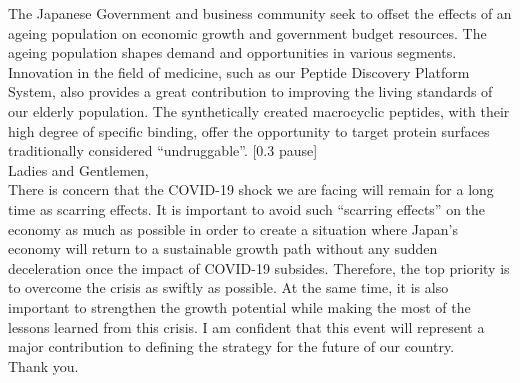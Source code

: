 The Japanese Government and business community seek to offset the effects of an ageing population on economic growth and government budget resources. The ageing population shapes demand and opportunities in various segments. Innovation in the field of medicine, such as our Peptide Discovery Platform System, also provides a great contribution to improving the living standards of our elderly population. The synthetically created macrocyclic peptides, with their high degree of specific binding, offer the opportunity to target protein surfaces traditionally considered “undruggable”. [0.3 pause] \\ 

\noindent Ladies and Gentlemen, \\
There is concern that the COVID-19 shock we are facing will remain for a long time as scarring effects. It is important to avoid such “scarring effects” on the economy as much as possible in order to create a situation where Japan's economy will return to a sustainable growth path without any sudden deceleration once the impact of COVID-19 subsides. Therefore, the top priority is to overcome the crisis as swiftly as possible. At the same time, it is also important to strengthen the growth potential while making the most of the lessons learned from this crisis. I am confident that this event will represent a major contribution to defining the strategy for the future of our country. \\
Thank you.






